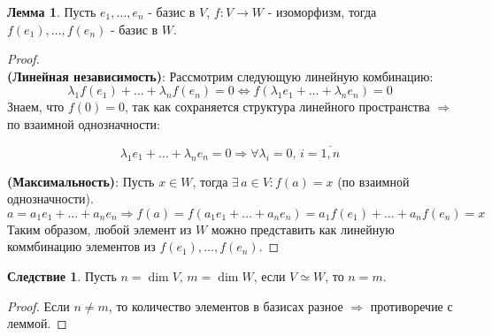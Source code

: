 \documentclass[12pt]{article}
\theoremstyle{definition}
\newtheorem{lemma}{Лемма}
\newtheorem{corollary}{Следствие}
\begin{document}
\begin{lemma}
	Пусть $e_1,\dotsc, e_n$ - базис в $V$, $f\colon V \to W$ - изоморфизм, тогда $f(e_1),\dotsc, f(e_n)$ - базис в $W$.
\end{lemma}
\begin{proof}\hfill\\
	\textbf{(Линейная независимость)}: Рассмотрим следующую линейную комбинацию:
	$$
		\lambda_1 f(e_1) + \dotsc + \lambda_n f(e_n) = 0 \Leftrightarrow f(\lambda_1 e_1 + \dotsc + \lambda_n e_n) = 0
	$$
	Знаем, что $f(0) = 0$, так как сохраняется структура линейного пространства $\Rightarrow$ по взаимной однозначности:
	
	$$
		\lambda_1 e_1 + \dotsc + \lambda_n e_n = 0 \Rightarrow \forall \lambda_i = 0,\, i = \overline{1,n}
	$$
	
	\textbf{(Максимальность)}: Пусть $x \in W$, тогда $\exists \, a \in V \colon f(a) = x$ (по взаимной однозначности). 
	$$
		a = a_1 e_1 + \dotsc + a_n e_n \Rightarrow f(a) = f(a_1 e_1 + \dotsc + a_n e_n) = a_1 f(e_1) + \dotsc + a_n f(e_n) = x 
	$$
	Таким образом, любой элемент из $W$ можно представить как линейную коммбинацию элементов из $f(e_1),\dotsc, f(e_n)$.
\end{proof}
\newpage
\begin{corollary}
	Пусть $n = \dim{V},\, m = \dim{W}$, если $V \simeq W$, то $n = m$.
\end{corollary}
\begin{proof}
	Если $n \neq m$, то количество элементов в базисах разное $\Rightarrow$ противоречие с леммой.
\end{proof}
\end{document}

